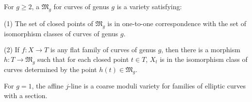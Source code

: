 For $g \geqslant 2$, a  $\mathfrak{M}_g$ for curves of genus $g$ is a variety satisfying:

(1) The set of closed points of $\mathfrak{M}_g$ is in one-to-one correspondence with the set of isomorphism classes of curves of genus $g$.

(2) If $f: X \to T$ is any flat family of curves of genus $g$, then there is a morphism $h: T \to \mathfrak{M}_g$ such that for each closed point $t \in T$, $X_t$ is in the isomorphism class of curves determined by the point $h(t) \in \mathfrak{M}_g$.

For $g = 1$, the affine $j$-line is a coarse moduli variety for families of elliptic curves with a section.
